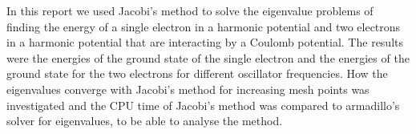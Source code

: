 In this report we used Jacobi's method to solve the eigenvalue problems of finding the energy of a single electron in a harmonic potential and two electrons in a harmonic potential that are interacting by a Coulomb potential. The results were the energies of the ground state of the single electron and the energies of the ground state for the two electrons for different oscillator frequencies. How the eigenvalues converge with Jacobi's method for increasing mesh points was investigated and the CPU time of Jacobi's method was compared to armadillo's solver for eigenvalues, to be able to analyse the method.